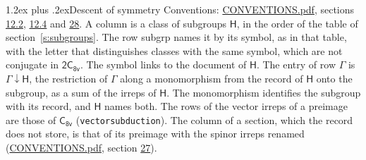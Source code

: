 \documentclass[10pt,a4paper]{article}
\makeatletter
\renewcommand\section{\@startsection{section}{1}{\z@}{-3ex plus -1ex minus -.2ex}%
  {1.2ex plus .2ex}{\normalfont\large\sffamily\bfseries\color{parttitle}}}
\numberwithin{equation}{section}
\newcommand{\grp}[1]{\mathsf{#1}}
\newcommand{\restr}[2]{#1\!\downarrow#2}
\makeatother
\begin{document}
\section{Descent of symmetry}\label{s:subduction}
Conventions: \href{../../CONVENTIONS.pdf}{CONVENTIONS.pdf}, sections \href{../../../rotation/CONVENTIONS.pdf\#conv.12.2}{12.2}, \href{../../../rotation/CONVENTIONS.pdf\#conv.12.4}{12.4} and \href{../../CONVENTIONS.pdf\#conv.28}{28}.
A column is a class of subgroups $\grp{H}$, in the order of the table of section~\ref{s:subgroups}. The row subgrp names it by its symbol, as in that table, with the letter that distinguishes classes with the same symbol, which are not conjugate in $\grp{2C_{8v}}$. The symbol links to the document of $\grp{H}$. The entry of row $\Gamma$ is $\restr{\Gamma}{\grp{H}}$, the restriction of $\Gamma$ along a monomorphism from the record of $\grp{H}$ onto the subgroup, as a sum of the irreps of $\grp{H}$. The monomorphism identifies the subgroup with its record, and $\grp{H}$ names both. The rows of the vector irreps of a preimage are those of \href{../../../rotation/data/pdf/C8v.pdf}{$\grp{C_{8v}}$} (\texttt{vectorsubduction}). The column of a section, which the record does not store, is that of its preimage with the spinor irreps renamed (\href{../../CONVENTIONS.pdf}{CONVENTIONS.pdf}, section \href{../../CONVENTIONS.pdf\#conv.27}{27}).
\end{document}
